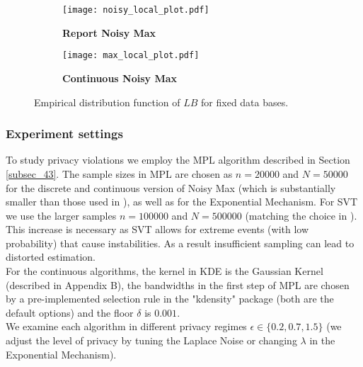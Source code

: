 \documentclass[conference]{IEEEtran}
\begin{document}
\begin{figure*}[ht]
\begin{subfigure}[c]{.49\linewidth}
\centering
\caption{\textbf{Report Noisy Max}}
\texttt{[image: noisy\_local\_plot.pdf]}
\label{noisy_local_plot}
\end{subfigure}\quad
\begin{subfigure}[c]{.49\linewidth}
\centering
\caption{\textbf{Continuous Noisy Max}}
\texttt{[image: max\_local\_plot.pdf]}
\label{max_local_plot}
\end{subfigure}\caption{Empirical distribution function of $LB$ for fixed data bases.}  \label{Figure_eps_x}
\end{figure*}












\subsubsection*{\textbf{Experiment settings}}  
To study privacy violations we employ the MPL algorithm described in Section \ref{subsec_43}. The sample sizes in MPL are chosen as $n=20000$ and $N=50000$ for the discrete and continuous version of Noisy Max  (which is substantially smaller than those used in \cite{StatDP}), as well as for the Exponential Mechanism.  For SVT we use the larger samples $n=100000$ and  $N=500000$ (matching the choice in \cite{StatDP}). 
This increase is necessary as SVT allows for extreme events (with low probability) that cause instabilities. As a result insufficient sampling can lead to distorted estimation. \\
For the continuous algorithms, the kernel in KDE is the Gaussian Kernel (described in Appendix B), the bandwidths in the first step of MPL are chosen by a pre-implemented selection rule in the "kdensity" package (both are the default options) and the floor $\delta$ is $0.001$.\\
We examine each algorithm in different privacy regimes $\epsilon \in \{ 0.2, 0.7, 1.5 \} $ \cite{StatDP} (we adjust the level of privacy by tuning the Laplace Noise or changing $\lambda$ in the Exponential Mechanism).
\end{document}
